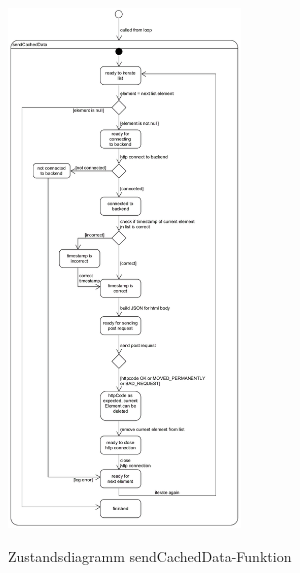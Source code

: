 \begin{figure}[H]
    \centering
    \begin{minipage}[t]{1\textwidth}
        \caption{Zustandsdiagramm sendCachedData-Funktion}
        \includegraphics[width=0.55\textwidth]{img/zustandsdiagramm_nodemcu_sendCachedData.png}\\
        \label{fig:zust_diag_nodemcu_send}
    \end{minipage}
\end{figure}

